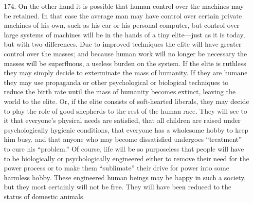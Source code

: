 \documentclass{article}
\begin{document}
174. On the other hand it is possible that human control over the machines may be retained. In 
that case the average man may have control over certain private machines of his own, such as his 
car or his personal computer, but control over large systems of machines will be in the hands of a 
tiny elite—just as it is today, but with two differences. Due to improved techniques the elite will 
have greater control over the masses; and because human work will no longer be necessary the 
masses will be superfluous, a useless burden on the system. If the elite is ruthless they may simply 
decide to exterminate the mass of humanity. If they are humane they may use propaganda or other 
psychological or biological techniques to reduce the birth rate until the mass of humanity becomes 
extinct, leaving the world to the elite. Or, if the elite consists of soft-hearted liberals, they may 
decide to play the role of good shepherds to the rest of the human race. They will see to it that 
everyone’s physical needs are satisfied, that all children are raised under psychologically hygienic 
conditions, that everyone has a wholesome hobby to keep him busy, and that anyone who may 
become dissatisfied undergoes “treatment” to cure his “problem.” Of course, life will be so 
purposeless that people will have to be biologically or psychologically engineered either to remove 
their need for the power process or to make them “sublimate” their drive for power into some 
harmless hobby. These engineered human beings may be happy in such a society, but they most 
certainly will not be free. They will have been reduced to the status of domestic animals. \vspace{\baselineskip}
\end{document}
